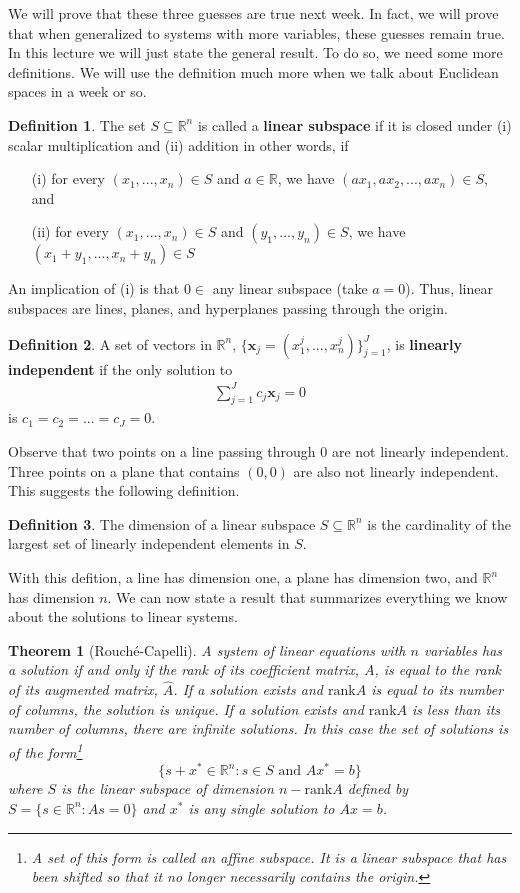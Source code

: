 \documentclass[12pt,reqno]{amsart}
\newcommand{\rank}{\mathrm{rank}}
\newtheorem{theorem}{Theorem}[section]
\theoremstyle{definition}
\newtheorem{definition}{Definition}[section]
\begin{document}
We will prove that these three guesses are true next week. In fact, we
will prove that when generalized to systems with more variables, these
guesses remain true. In this lecture we will just state the general
result. To do so, we need some more definitions. We will use the
definition much more when we talk about Euclidean spaces in a week or
so.
\begin{definition}
  The set $S \subseteq \mathbb{R}^n$ is called a \textbf{linear
    subspace} if it is closed under (i) scalar multiplication and (ii)
  addition in other words, if 
  \begin{itemize}
  \item[(i)] for every $(x_1, ..., x_n)\in S$ and $a \in \mathbb{R}$,
    we have $(a x_1, a x_2, ..., a x_n) \in S$, and
  \item[(ii)] for every $(x_1, ..., x_n)\in S$ and $(y_1, ..., y_n)\in
    S$, we have
    $(x_1 + y_1, ..., x_n + y_n)  \in S$
  \end{itemize}
\end{definition}
An implication of (i) is that $0 \in$ any linear subspace (take $a =
0$). Thus, linear subspaces are lines, planes, and hyperplanes passing
through the origin. 
\begin{definition}
  A set of vectors in $\mathbb{R}^n$, $\{\textbf{x}_j = (x^j_1,...,
  x^j_n)\}_{j=1}^J$, is \textbf{linearly independent} if the only
  solution to 
  \begin{align*}
    \sum_{j=1}^J c_j \textbf{x}_j = 0 
  \end{align*}
  is $c_1 = c_2 = ... = c_J = 0$. 
\end{definition}
Observe that two points on a line passing through 0 are not linearly
independent. Three points on a plane that contains $(0,0)$ are also not linearly
independent. This suggests the following definition.
\begin{definition}
  The dimension of a linear subspace $S \subseteq \mathbb{R}^n$ is the
  cardinality of the largest set of linearly independent elements in
  $S$. 
\end{definition} 
With this defition, a line has dimension one, a plane has dimension
two, and $\mathbb{R}^n$ has dimension $n$. We can now state a result
that summarizes everything we know about the solutions to linear
systems. 
\begin{theorem}[Rouch\'{e}-Capelli] \label{thm:rc} A system of linear
  equations with $n$ variables has a solution if and only if the rank
  of its coefficient matrix, $A$, is equal to the rank of its
  augmented matrix, $\hat{A}$. If a solution exists and $\rank A$ is
  equal to its number of columns, the solution is unique. If a
  solution exists and $\rank A$ is less than its number of columns,
  there are infinite solutions. In this case the set of solutions
  is of the form\footnote{A set of this form is called an affine
    subspace. It is a linear subspace that has been shifted so that it
    no longer necessarily contains the origin.}
  \[ 
  \{s+x^* \in \mathbb{R}^n : s \in S \text{ and } Ax^* = b \} 
  \]
  where $S$ is the linear subspace of dimension $n - \rank A$ defined
  by $S = \{s \in \mathbb{R}^n: As = 0 \}$ and $x^*$
  is any single solution to $A x = b$.
\end{theorem}
\end{document}
